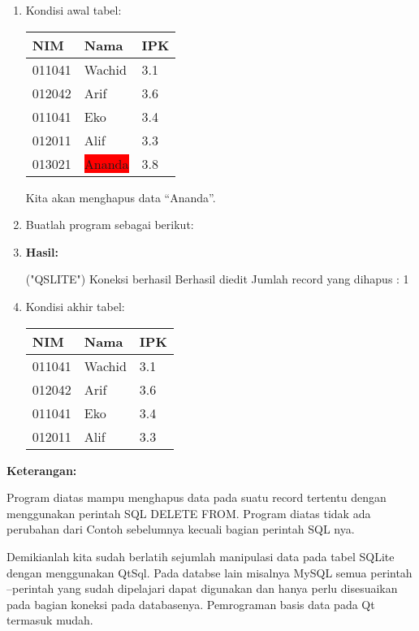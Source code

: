 \begin{enumerate}
\item Kondisi awal tabel:

\begin{tabular}{|l|l|l|}
\hline
NIM & Nama & IPK \\ \hline
011041 & Wachid & 3.1 \\ \hline
012042 & Arif & 3.6 \\ \hline
011041 & Eko & 3.4 \\ \hline
012011 & Alif & 3.3 \\ \hline
013021 & \colorbox{red}{Ananda} & 3.8 \\ \hline
\end{tabular}

Kita akan menghapus data ``Ananda''.

\item Buatlah program sebagai berikut:



\item \textbf{Hasil:}

\begin{lcverbatim}
("QSLITE")
Koneksi berhasil
Berhasil diedit
Jumlah record yang dihapus : 1
\end{lcverbatim}

\item Kondisi akhir tabel:

\begin{tabular}{|l|l|l|}
\hline
NIM & Nama & IPK \\ \hline
011041 & Wachid & 3.1 \\ \hline
012042 & Arif & 3.6 \\ \hline
011041 & Eko & 3.4 \\ \hline
012011 & Alif & 3.3 \\ \hline

\end{tabular}

\end{enumerate}

\textbf{Keterangan:}

Program diatas mampu menghapus data pada suatu record tertentu dengan
menggunakan perintah SQL DELETE FROM. Program diatas tidak ada perubahan
dari Contoh sebelumnya kecuali bagian perintah SQL nya.

Demikianlah kita sudah berlatih sejumlah manipulasi data pada tabel
SQLite dengan menggunakan QtSql. Pada databse lain misalnya MySQL semua
perintah --perintah yang sudah dipelajari dapat digunakan dan hanya
perlu disesuaikan pada bagian koneksi pada databasenya. Pemrograman
basis data pada Qt termasuk mudah.

